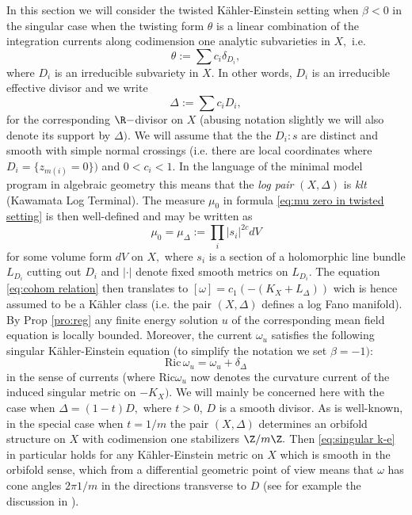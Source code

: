 \documentclass[11pt,oneside,english]{amsart}
\numberwithin{equation}{section}
\numberwithin{figure}{section}
\theoremstyle{plain}
\theoremstyle{plain}
\theoremstyle{plain}
\theoremstyle{plain}
\theoremstyle{remark}
\theoremstyle{definition}
\begin{document}
In this section we will consider the twisted Kähler-Einstein setting
when $\beta<0$ in the singular case when the twisting form $\theta$
is a linear combination of the integration currents along codimension
one analytic subvarieties in $X,$ i.e. 
\[
\theta:=\sum c_{i}\delta_{D_{i}},
\]
 where $D_{i}$ is an irreducible subvariety in $X.$ In other words,
$D_{i}$ is an irreducible effective divisor and we write 
\begin{equation}
\Delta:=\sum c_{i}D_{i},\label{eq:def of divisor delta}
\end{equation}
 for the corresponding $\R-$divisor on $X$ (abusing notation slightly
we will also denote its support by $\Delta).$ We will assume that
the the $D_{i}:s$ are distinct and smooth with simple normal crossings
(i.e. there are local coordinates where $D_{i}=\{z_{m(i)}=0\})$ and
$0<c_{i}<1.$ In the language of the minimal model program in algebraic
geometry this means that the \emph{log pair} $(X,\Delta)$ is\emph{
klt} (Kawamata Log Terminal). The measure $\mu_{0}$ in formula \ref{eq:mu zero in twisted setting}
is then well-defined and may be written as 
\begin{equation}
\mu_{0}=\mu_{\Delta}:=\prod_{i}|s_{i}|^{2c}dV\label{eq:measure def by klt div}
\end{equation}
 for some volume form $dV$ on $X,$ where $s_{i}$ is a section of
a holomorphic line bundle $L_{D_{i}}$ cutting out $D_{i}$ and $|\cdot|$
denote fixed smooth metrics on $L_{D_{i}}.$ The equation \ref{eq:cohom relation}
then translates to $[\omega]=c_{1}(-(K_{X}+L_{\Delta}))$ wich is
hence assumed to be a Kähler class (i.e. the pair $(X,\Delta)$ defines
a log Fano manifold). By Prop \ref{pro:reg} any finite energy solution
$u$ of the corresponding mean field equation is locally bounded.
Moreover, the current $\omega_{u}$ satisfies the following singular
Kähler-Einstein equation (to simplify the notation we set $\beta=-1):$
\begin{equation}
\mbox{Ric}\,\omega_{u}=\omega_{u}+\delta_{\Delta}\label{eq:singular k-e}
\end{equation}
 in the sense of currents (where $\mbox{Ric}\omega_{u}$ now denotes
the curvature current of the induced singular metric on $-K_{X}).$
We will mainly be concerned here with the case when $\Delta=(1-t)D,$
where $t>0$, $D$ is a smooth divisor. As is well-known, in the special
case when $t=1/m$ the pair $(X,\Delta)$ determines an orbifold structure
on $X$ with codimension one stabilizers $\Z/m\Z.$ Then \ref{eq:singular k-e}
in particular holds for any Kähler-Einstein metric on $X$ which is
smooth in the orbifold sense, which from a differential geometric
point of view means that $\omega$ has cone angles $2\pi1/m$ in the
directions transverse to $D$ (see for example the discussion in \cite{r-t}). 
\end{document}
